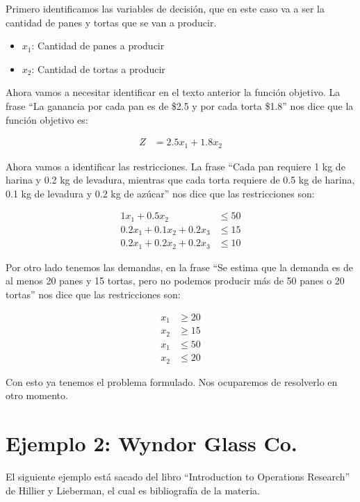 \documentclass[12pt]{article}
\begin{document}
Primero identificamos las variables de decisión, que en este caso va a ser la cantidad de panes y tortas que se van a producir.

\begin{itemize}
    \item $x_1$: Cantidad de panes a producir
    \item $x_2$: Cantidad de tortas a producir
\end{itemize}

Ahora vamos a necesitar identificar en el texto anterior la función objetivo. La frase ``La ganancia por cada pan es de \$2.5 y por cada torta \$1.8'' nos dice que la función objetivo es:

\begin{align*}
Z &= 2.5x_1 + 1.8x_2
\end{align*}

Ahora vamos a identificar las restricciones. La frase ``Cada pan requiere 1 kg de harina y 0.2 kg de levadura, mientras que cada torta requiere de 0.5 kg de harina, 0.1 kg de levadura y 0.2 kg de azúcar'' nos dice que las restricciones son:

\begin{align*}
1x_1 + 0.5x_2 &\leq 50 \\
0.2x_1 + 0.1x_2 + 0.2x_3 &\leq 15 \\
0.2x_1 + 0.2x_2 + 0.2x_3 &\leq 10
\end{align*}

Por otro lado tenemos las demandas, en la frase ``Se estima que la demanda es de al menos 20 panes y 15 tortas, pero no podemos producir más de 50 panes o 20 tortas'' nos dice que las restricciones son:

\begin{align*}
x_1 &\geq 20 \\
x_2 &\geq 15 \\
x_1 &\leq 50 \\
x_2 &\leq 20
\end{align*}

Con esto ya tenemos el problema formulado. Nos ocuparemos de resolverlo en otro momento.

\section{Ejemplo 2: Wyndor Glass Co.}

El siguiente ejemplo está sacado del libro ``Introduction to Operations Research'' de Hillier y Lieberman, el cual es bibliografía de la materia.
\end{document}
